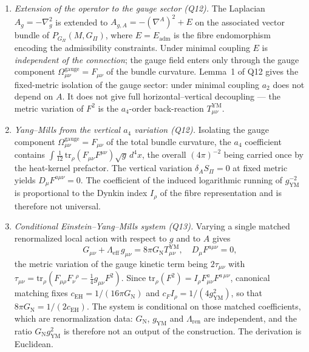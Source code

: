 \documentclass[11pt,a4paper]{article}
\theoremstyle{definition}
\newcommand{\GN}{G_{\mathrm{N}}}
\newcommand{\gYM}{g_{\mathrm{YM}}}
\newcommand{\cEH}{c_{\mathrm{EH}}}
\newcommand{\cF}{c_{F}}
\newcommand{\Irho}{I_\rho}
\newcommand{\SPI}{S_\Pi}
\newcommand{\Gpi}{G_\Pi}
\begin{document}
    \begin{enumerate}
      \item \textit{Extension of the operator to the gauge sector (Q12).}
      The Laplacian $A_g = -\nabla_g^2$ is extended to
      $A_{g,A} = -(\nabla^A)^2 + E$
      on the associated vector bundle of $P_{\Gpi}(M,\Gpi)$, where $E = E_{\mathrm{adm}}$ is the
      fibre endomorphism encoding the admissibility constraints. Under minimal coupling $E$ is
      \emph{independent of the connection}; the gauge field enters only through the gauge
      component $\Omega^{\mathrm{gauge}}_{\mu\nu} = F_{\mu\nu}$ of the bundle curvature.
      Lemma~1 of Q12 gives the fixed-metric isolation of the gauge sector: under minimal
      coupling $a_2$ does not depend on $A$. It does not give full horizontal--vertical
      decoupling --- the metric variation of $F^2$ is the $a_4$-order back-reaction
      $T^{\mathrm{YM}}_{\mu\nu}$.

      \item \textit{Yang--Mills from the vertical $a_4$ variation (Q12).}
      Isolating the gauge component $\Omega^{\mathrm{gauge}}_{\mu\nu} = F_{\mu\nu}$ of the total
      bundle curvature, the $a_4$ coefficient contains
      $\int \tfrac{1}{12}\,\mathrm{tr}_\rho(F_{\mu\nu}F^{\mu\nu})\sqrt{g}\,d^4x$,
      the overall $(4\pi)^{-2}$ being carried once by the heat-kernel prefactor.
      The vertical variation $\delta_A \SPI = 0$ at fixed metric yields $D_\mu F^{a\mu\nu} = 0$.
      The coefficient of the induced logarithmic running of $\gYM^{-2}$ is proportional to the
      Dynkin index $\Irho$ of the fibre representation and is therefore not universal.

      \item \textit{Conditional Einstein--Yang--Mills system (Q13).}
      Varying a single matched renormalized local action with respect to $g$ and to $A$ gives
      \[
        G_{\mu\nu} + \Lambda_{\mathrm{eff}}\,g_{\mu\nu} = 8\pi\GN T^{\mathrm{YM}}_{\mu\nu},
        \quad D_\mu F^{a\mu\nu} = 0,
      \]
      the metric variation of the gauge kinetic term being $2\tau_{\mu\nu}$ with
      $\tau_{\mu\nu} = \mathrm{tr}_\rho(F_{\mu\rho}F_\nu{}^\rho - \tfrac14 g_{\mu\nu}F^2)$.
      Since $\mathrm{tr}_\rho(F^2) = \Irho F^a_{\mu\nu}F^{a\,\mu\nu}$, canonical matching fixes
      $\cEH = 1/(16\pi\GN)$ and $\cF\Irho = 1/(4\gYM^2)$, so that $8\pi\GN = 1/(2\cEH)$.
      The system is conditional on those matched coefficients, which are renormalization data:
      $\GN$, $\gYM$ and $\Lambda_{\mathrm{ren}}$ are independent, and the ratio $\GN\gYM^2$ is
      therefore not an output of the construction.
      The derivation is Euclidean.
    \end{enumerate}
\end{document}
